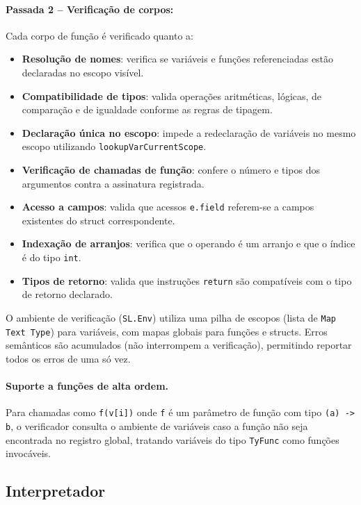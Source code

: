 \documentclass[12pt,a4paper]{article}
\begin{document}
\paragraph{Passada 2 -- Verificação de corpos:} Cada corpo de função é verificado quanto a:

\begin{itemize}
    \item \textbf{Resolução de nomes}: verifica se variáveis e funções referenciadas estão declaradas no escopo visível.
    \item \textbf{Compatibilidade de tipos}: valida operações aritméticas, lógicas, de comparação e de igualdade conforme as regras de tipagem.
    \item \textbf{Declaração única no escopo}: impede a redeclaração de variáveis no mesmo escopo utilizando \texttt{lookupVarCurrentScope}.
    \item \textbf{Verificação de chamadas de função}: confere o número e tipos dos argumentos contra a assinatura registrada.
    \item \textbf{Acesso a campos}: valida que acessos \texttt{e.field} referem-se a campos existentes do struct correspondente.
    \item \textbf{Indexação de arranjos}: verifica que o operando é um arranjo e que o índice é do tipo \texttt{int}.
    \item \textbf{Tipos de retorno}: valida que instruções \texttt{return} são compatíveis com o tipo de retorno declarado.
\end{itemize}

O ambiente de verificação (\texttt{SL.Env}) utiliza uma pilha de escopos (lista de \texttt{Map Text Type}) para variáveis, com mapas globais para funções e structs. Erros semânticos são acumulados (não interrompem a verificação), permitindo reportar todos os erros de uma só vez.

\paragraph{Suporte a funções de alta ordem.} Para chamadas como \texttt{f(v[i])} onde \texttt{f} é um parâmetro de função com tipo \texttt{(a) -> b}, o verificador consulta o ambiente de variáveis caso a função não seja encontrada no registro global, tratando variáveis do tipo \texttt{TyFunc} como funções invocáveis.

\subsection{Interpretador}
\end{document}
